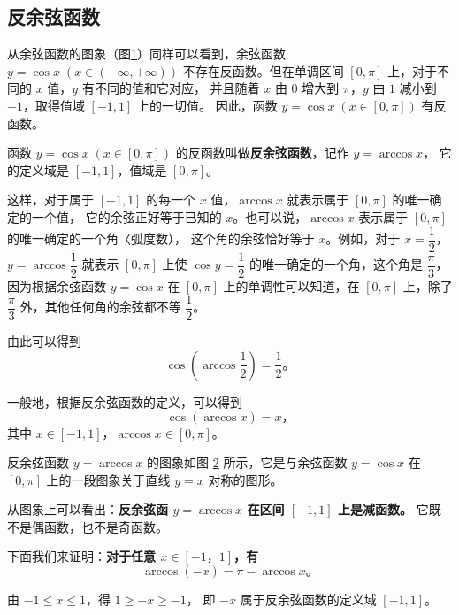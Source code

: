 \subsection{反余弦函数}\label{subsec:1-2}

从余弦函数的图象（图\ref{fig:1-4}）同样可以看到，余弦函数 $y = \cos x \; (x \in (-\infty, +\infty))$
不存在反函数。但在单调区间 $[0, \pi]$ 上，对于不同的 $x$ 值，$y$ 有不同的值和它对应，
并且随着 $x$ 由 $0$ 增大到 $\pi$，$y$ 由 $1$ 减小到 $-1$，取得值域 $[-1, 1]$ 上的一切值。
因此，函数 $y = \cos x \; (x \in [0, \pi])$ 有反函数。

\begin{figure}[htbp]
    \centering
    
    \caption{}\label{fig:1-4}
\end{figure}

函数 $y = \cos x \; (x \in [0, \pi])$ 的反函数叫做\textbf{反余弦函数}，记作 $y = \arccos x$，
它的定义域是 $[-1, 1]$，值域是 $[0, \pi]$。

这样，对于属于 $[-1, 1]$ 的每一个 $x$ 值，$\arccos x$ 就表示属于 $[0, \pi]$ 的唯一确定的一个值，
它的余弦正好等于已知的 $x$。也可以说，$\arccos x$ 表示属于 $[0, \pi]$ 的唯一确定的一个角〈弧度数），
这个角的余弦恰好等于 $x$。例如，对于 $x = \dfrac{1}{2}$，$y = \arccos \dfrac{1}{2}$
就表示 $[0, \pi]$ 上使 $\cos y = \dfrac{1}{2}$ 的唯一确定的一个角，这个角是 $\dfrac{\pi}{3}$，
因为根据余弦函数 $y = \cos x$ 在 $[0, \pi]$ 上的单调性可以知道，在 $[0, \pi]$ 上，除了
$\dfrac{\pi}{3}$ 外，其他任何角的余弦都不等 $\dfrac{1}{2}$。

由此可以得到
$$\cos\left( \arccos \dfrac{1}{2} \right) = \dfrac{1}{2} \text{。}$$

一般地，根据反余弦函数的定义，可以得到
$$ \cos(\arccos x) = x \text{，}$$
其中 $x \in [-1, 1]$，$\arccos x \in [0, \pi]$。

反余弦函数 $y = \arccos x$ 的图象如图 \ref{fig:1-5} 所示，它是与余弦函数 $y = \cos x$
在 $[0, \pi]$ 上的一段图象关于直线 $y = x$ 对称的图形。

\begin{figure}[htbp]
    \centering
    
    \caption{}\label{fig:1-5}
\end{figure}

从图象上可以看出：\textbf{反余弦函 $y = \arccos x$ 在区间 $[-1, 1]$ 上是减函数。}
它既不是偶函数，也不是奇函数。

下面我们来证明：\textbf{对于任意 $x \in [-1，1]$，有}
$$ \arccos (-x) = \pi - \arccos x \text{。}$$

\zhengming 由 $-1 \leqslant x \leqslant 1$，得 $1 \geqslant -x \geqslant -1$，
即 $-x$ 属于反余弦函数的定义域 $[-1, 1]$。

